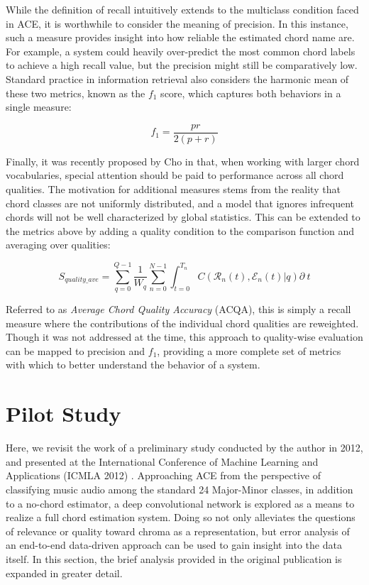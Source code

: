 \noindent While the definition of recall intuitively extends to the multiclass condition faced in ACE, it is worthwhile to consider the meaning of precision.
In this instance, such a measure provides insight into how reliable the estimated chord name are.
For example, a system could heavily over-predict the most common chord labels to achieve a high recall value, but the precision might still be comparatively low.
Standard practice in information retrieval also considers the harmonic mean of these two metrics, known as the $f_1$ score, which captures both behaviors in a single measure:

\begin{equation}
f_1 = \frac{pr}{2(p+r)}
\end{equation}

Finally, it was recently proposed by Cho in \cite{Cho2014PhD} that, when working with larger chord vocabularies, special attention should be paid to performance across all chord qualities.
The motivation for additional measures stems from the reality that chord classes are not uniformly distributed, and a model that ignores infrequent chords will not be well characterized by global statistics.
This can be extended to the metrics above by adding a quality condition to the comparison function and averaging over qualities:

\begin{equation}
S_{quality\_ave} = \sum_{q=0}^{Q-1}\frac{1}{W_q}\sum_{n=0}^{N-1}\int_{t=0}^{T_n}C(\mathcal{R}_n(t), \mathcal{E}_n(t) | q)\partial~t
\end{equation}

\noindent Referred to as \emph{Average Chord Quality Accuracy} (ACQA), this is simply a recall measure where the contributions of the individual chord qualities are reweighted.
Though it was not addressed at the time, this approach to quality-wise evaluation can be mapped to precision and $f_{1}$, providing a more complete set of metrics with which to better understand the behavior of a system.


\section{Pilot Study}
\label{sec:pilot_study}

Here, we revisit the work of a preliminary study conducted by the author in 2012, and presented at the International Conference of Machine Learning and Applications (ICMLA 2012) \cite{Humphrey2012}.
Approaching ACE from the perspective of classifying music audio among the standard 24 Major-Minor classes, in addition to a no-chord estimator, a deep convolutional network is explored as a means to realize a full chord estimation system.
Doing so not only alleviates the questions of relevance or quality toward chroma as a representation, but error analysis of an end-to-end data-driven approach can be used to gain insight into the data itself.
In this section, the brief analysis provided in the original publication is expanded in greater detail.


